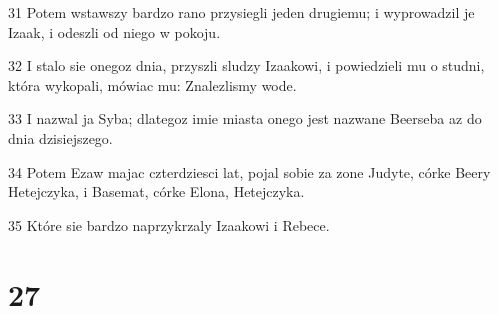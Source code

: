 \par 31 Potem wstawszy bardzo rano przysiegli jeden drugiemu; i wyprowadzil je Izaak, i odeszli od niego w pokoju.
\par 32 I stalo sie onegoz dnia, przyszli sludzy Izaakowi, i powiedzieli mu o studni, która wykopali, mówiac mu: Znalezlismy wode.
\par 33 I nazwal ja Syba; dlategoz imie miasta onego jest nazwane Beerseba az do dnia dzisiejszego.
\par 34 Potem Ezaw majac czterdziesci lat, pojal sobie za zone Judyte, córke Beery Hetejczyka, i Basemat, córke Elona, Hetejczyka.
\par 35 Które sie bardzo naprzykrzaly Izaakowi i Rebece.

\chapter{27}

